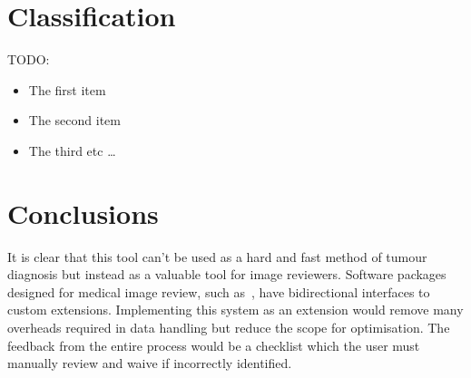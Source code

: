 \documentclass[journal]{IEEEtran}
\begin{document}
\section{Classification}
\label{sec:class}



TODO:


\begin{itemize}
  \item The first item
  \item The second item
  \item The third etc \ldots
\end{itemize}










\section{Conclusions}
\label{sec:conclusions}

It is clear that this tool can't be used as a hard and fast method of tumour diagnosis but instead as a valuable tool for image reviewers.
Software packages designed for medical image review, such as~\cite{slicer}, have bidirectional interfaces to custom extensions.
Implementing this system as an extension would remove many overheads required in data handling but reduce the scope for optimisation.
The feedback from the entire process would be a checklist which the user must manually review and waive if incorrectly identified. 












\end{document}
